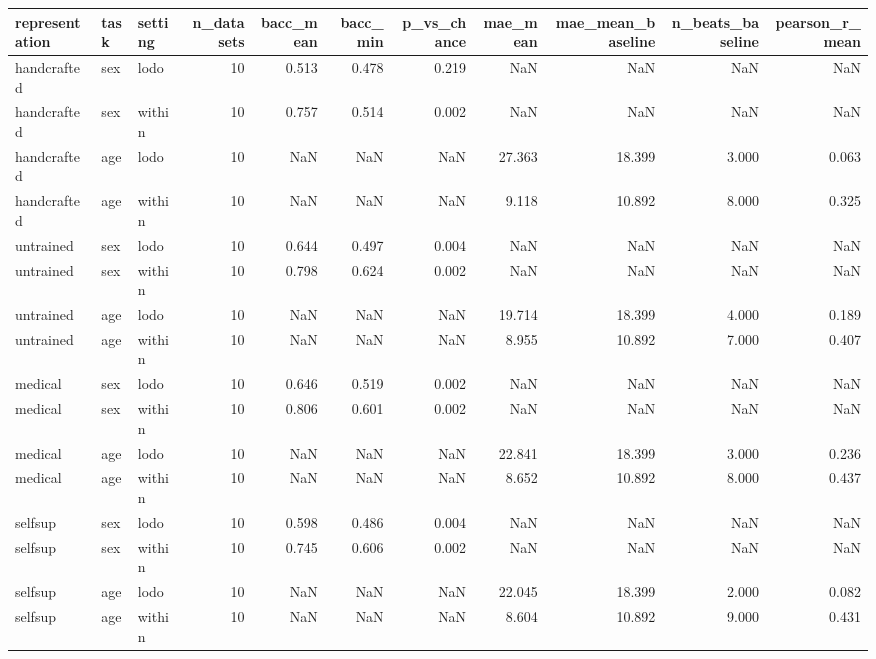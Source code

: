 \begin{tabular}{lllrrrrrrrr}
\toprule
representation & task & setting & n\_datasets & bacc\_mean & bacc\_min & p\_vs\_chance & mae\_mean & mae\_mean\_baseline & n\_beats\_baseline & pearson\_r\_mean \\
\midrule
handcrafted & sex & lodo & 10 & 0.513 & 0.478 & 0.219 & NaN & NaN & NaN & NaN \\
handcrafted & sex & within & 10 & 0.757 & 0.514 & 0.002 & NaN & NaN & NaN & NaN \\
handcrafted & age & lodo & 10 & NaN & NaN & NaN & 27.363 & 18.399 & 3.000 & 0.063 \\
handcrafted & age & within & 10 & NaN & NaN & NaN & 9.118 & 10.892 & 8.000 & 0.325 \\
untrained & sex & lodo & 10 & 0.644 & 0.497 & 0.004 & NaN & NaN & NaN & NaN \\
untrained & sex & within & 10 & 0.798 & 0.624 & 0.002 & NaN & NaN & NaN & NaN \\
untrained & age & lodo & 10 & NaN & NaN & NaN & 19.714 & 18.399 & 4.000 & 0.189 \\
untrained & age & within & 10 & NaN & NaN & NaN & 8.955 & 10.892 & 7.000 & 0.407 \\
medical & sex & lodo & 10 & 0.646 & 0.519 & 0.002 & NaN & NaN & NaN & NaN \\
medical & sex & within & 10 & 0.806 & 0.601 & 0.002 & NaN & NaN & NaN & NaN \\
medical & age & lodo & 10 & NaN & NaN & NaN & 22.841 & 18.399 & 3.000 & 0.236 \\
medical & age & within & 10 & NaN & NaN & NaN & 8.652 & 10.892 & 8.000 & 0.437 \\
selfsup & sex & lodo & 10 & 0.598 & 0.486 & 0.004 & NaN & NaN & NaN & NaN \\
selfsup & sex & within & 10 & 0.745 & 0.606 & 0.002 & NaN & NaN & NaN & NaN \\
selfsup & age & lodo & 10 & NaN & NaN & NaN & 22.045 & 18.399 & 2.000 & 0.082 \\
selfsup & age & within & 10 & NaN & NaN & NaN & 8.604 & 10.892 & 9.000 & 0.431 \\
\bottomrule
\end{tabular}
